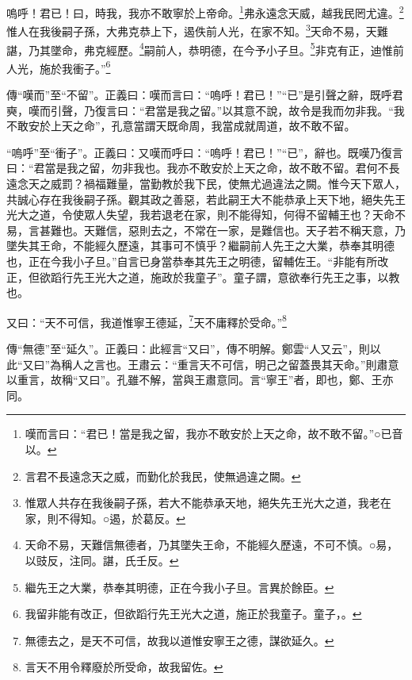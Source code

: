 嗚呼！君已！曰，時我，我亦不敢寧於上帝命。\footnote{嘆而言曰：“君已！當是我之留，我亦不敢安於上天之命，故不敢不留。”○已音以。}弗永遠念天威，越我民罔尤違。\footnote{言君不長遠念天之威，而勤化於我民，使無過違之闕。}惟人在我後嗣子孫，大弗克恭上下，遏佚前人光，在家不知。\footnote{惟眾人共存在我後嗣子孫，若大不能恭承天地，絕失先王光大之道，我老在家，則不得知。○遏，於葛反。}天命不易，天難諶，乃其墜命，弗克經歷。\footnote{天命不易，天難信無德者，乃其墜失王命，不能經久歷遠，不可不慎。○易，以豉反，注同。諶，氏壬反。}嗣前人，恭明德，在今予小子旦。\footnote{繼先王之大業，恭奉其明德，正在今我小子旦。言異於餘臣。}非克有正，迪惟前人光，施於我衝子。”\footnote{我留非能有改正，但欲蹈行先王光大之道，施正於我童子。童子，。}


{\noindent\zhuan{}\fzbyks 傳“嘆而”至“不留”。正義曰：嘆而言曰：“嗚呼！君已！”“已”是引聲之辭，既呼君奭，嘆而引聲，乃復言曰：“君當是我之留。”以其意不說，故令是我而勿非我。“我不敢安於上天之命”，孔意當謂天既命周，我當成就周道，故不敢不留。 \par}

{\noindent\shu{}\fzkt “嗚呼”至“衝子”。正義曰：又嘆而呼曰：“嗚呼！君已！”“已”，辭也。既嘆乃復言曰：“君當是我之留，勿非我也。我亦不敢安於上天之命，故不敢不留。君何不長遠念天之威罰？禍福難量，當勤教於我下民，使無尤過違法之闕。惟今天下眾人，共誠心存在我後嗣子孫。觀其政之善惡，若此嗣王大不能恭承上天下地，絕失先王光大之道，令使眾人失望，我若退老在家，則不能得知，何得不留輔王也？天命不易，言甚難也。天難信，惡則去之，不常在一家，是難信也。天子若不稱天意，乃墜失其王命，不能經久歷遠，其事可不慎乎？繼嗣前人先王之大業，恭奉其明德也，正在今我小子旦。”自言已身當恭奉其先王之明德，留輔佐王。“非能有所改正，但欲蹈行先王光大之道，施政於我童子”。童子謂，意欲奉行先王之事，以教也。 \par}

又曰：“天不可信，我道惟寧王德延，\footnote{無德去之，是天不可信，故我以道惟安寧王之德，謀欲延久。}天不庸釋於受命。”\footnote{言天不用令釋廢於所受命，故我留佐。}


{\noindent\zhuan{}\fzbyks 傳“無德”至“延久”。正義曰：此經言“又曰”，傳不明解。鄭雲“人又云”，則以此“又曰”為稱人之言也。王肅云：“重言天不可信，明己之留蓋畏其天命。”則肅意以重言，故稱“又曰”。孔雖不解，當與王肅意同。言“寧王”者，即也，鄭、王亦同。 \par}

